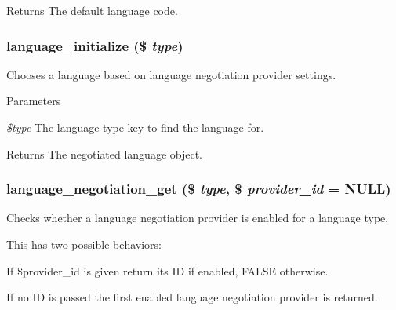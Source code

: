 \begin{DoxyReturn}{Returns}
The default language code. 
\end{DoxyReturn}
\hypertarget{group__language__negotiation_ga483a318f6485628cbe7bdbf53bf80c5e}{
\subsubsection[{language\_\-initialize}]{\setlength{\rightskip}{0pt plus 5cm}language\_\-initialize (\$ {\em type})}}
\label{group__language__negotiation_ga483a318f6485628cbe7bdbf53bf80c5e}
Chooses a language based on language negotiation provider settings.


\begin{DoxyParams}{Parameters}
\item[{\em \$type}]The language type key to find the language for.\end{DoxyParams}
\begin{DoxyReturn}{Returns}
The negotiated language object. 
\end{DoxyReturn}
\hypertarget{group__language__negotiation_ga041066fd7d9ca70def383225d104c431}{
\subsubsection[{language\_\-negotiation\_\-get}]{\setlength{\rightskip}{0pt plus 5cm}language\_\-negotiation\_\-get (\$ {\em type}, \/  \$ {\em provider\_\-id} = {\ttfamily NULL})}}
\label{group__language__negotiation_ga041066fd7d9ca70def383225d104c431}
Checks whether a language negotiation provider is enabled for a language type.

This has two possible behaviors:
\begin{DoxyItemize}
\item If \$provider\_\-id is given return its ID if enabled, FALSE otherwise.
\item If no ID is passed the first enabled language negotiation provider is returned.
\end{DoxyItemize}


